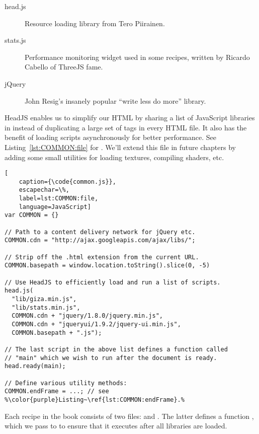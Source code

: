 \begin{description}
\item[head.js] Resource loading library from Tero Piirainen.
\item[stats.js] Performance monitoring widget used in some recipes, written by Ricardo Cabello of ThreeJS fame.
\item[jQuery] John Resig's insanely popular ``write less do more'' library.
\end{description}

HeadJS enables us to simplify our HTML by sharing a list of JavaScript libraries in  instead of duplicating a large set of  tags in every HTML file.  It also has the benefit of loading scripts asynchronously for better performance.  See Listing~\ref{lst:COMMON:file} for .  We'll extend this file in future chapters by adding some small utilities for loading textures, compiling shaders, etc.

\begin{lstlisting}[
    caption={\code{common.js}},
    escapechar=\%,
    label=lst:COMMON:file,
    language=JavaScript]
var COMMON = {}

// Path to a content delivery network for jQuery etc.
COMMON.cdn = "http://ajax.googleapis.com/ajax/libs/";

// Strip off the .html extension from the current URL.
COMMON.basepath = window.location.toString().slice(0, -5)

// Use HeadJS to efficiently load and run a list of scripts.
head.js(
  "lib/giza.min.js",
  "lib/stats.min.js",
  COMMON.cdn + "jquery/1.8.0/jquery.min.js",
  COMMON.cdn + "jqueryui/1.9.2/jquery-ui.min.js",
  COMMON.basepath + ".js");

// The last script in the above list defines a function called
// "main" which we wish to run after the document is ready.
head.ready(main);

// Define various utility methods:
COMMON.endFrame = ...; // see %\color{purple}Listing~\ref{lst:COMMON:endFrame}.%
\end{lstlisting} 

Each recipe in the book consists of two files:  and .  The latter defines a function , which we pass to  to ensure that it executes after all libraries are loaded.

\begin{comment}
{RecipeName}.js
{RecipeName}.html
common.js
css/style.css
lib/head.load.min.js
lib/giza.min.js
lib/stats.min.js
\end{comment}

